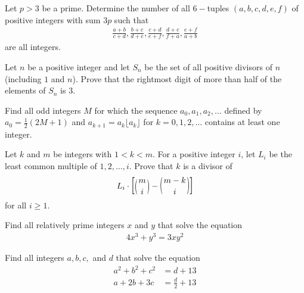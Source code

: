 \documentclass[problems.tex]{subfile}
\begin{document}
	\begin{problem}
		Let $p>3$ be a prime. Determine the number of all $6-$tuples $(a,b,c,d,e,f)$ of positive integers with sum $3p$ such that
			\begin{align*}
				\frac{a+b}{c+d}, \frac{b+c}{d+e}, \frac{c+d}{e+f}, \frac{d+e}{f+a}, \frac{e+f}{a+b}
			\end{align*}
		are all integers.
	\end{problem}

	\begin{problem}
		Let $n$ be a positive integer and let $S_n$ be the set of all positive divisors of $n$ (including $1$ and $n$). Prove that the rightmost digit of more than half of the elements of $S_n$ is $3$.
	\end{problem}

	\begin{problem}
		Find all odd integers $M$ for which the sequence $a_0,a_1,a_2,\dots$ defined by $a_0=\frac{1}{2}(2M+1)$ and $a_{k+1} = a_k \lfloor a_k \rfloor$ for $k=0,1,2,\dots$ contains at least one integer.
	\end{problem}

	\begin{problem}
		Let $k$ and $m$ be integers with $1 < k < m$. For a positive integer $i$, let $L_i$ be the least common multiple of $1,2,\ldots,i$.
		Prove that $k$ is a divisor of
			\begin{align*}
				L_i \cdot \squarebracket{\binom{m}{i} - \binom{m-k}{i}}
			\end{align*}
		for all $i \geq 1$. %
	\end{problem}

	\begin{problem}
		Find all relatively prime integers $x$ and $y$ that solve the equation
		\begin{align*}
			4x^3 + y^3 = 3xy^2
		\end{align*}
	\end{problem}

	\begin{problem}
		Find all integers $a,b,c,$ and $d$ that solve the equation
		\begin{align*}
			a^2 + b^2 + c^2 &= d + 13\\
			a + 2b + 3c &= \frac{d}{2}+ 13
		\end{align*}
	\end{problem}
\end{document}
